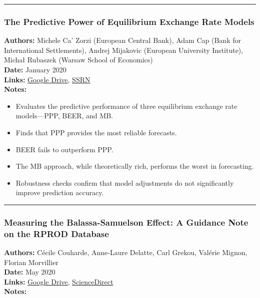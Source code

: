 \documentclass[
  11pt,
]{article}
\providecommand{\tightlist}{%
  \setlength{\itemsep}{0pt}\setlength{\parskip}{0pt}}
\begin{document}
\begin{center}\rule{0.5\linewidth}{0.5pt}\end{center}

\subsubsection{The Predictive Power of Equilibrium Exchange Rate
Models}\label{the-predictive-power-of-equilibrium-exchange-rate-models}

\textbf{Authors:} Michele Ca' Zorzi (European Central Bank), Adam Cap
(Bank for International Settlements), Andrej Mijakovic (European
University Institute), Michał Rubaszek (Warsaw School of Economics)\\
\textbf{Date:} January 2020\\
\textbf{Links:}
\href{https://drive.google.com/file/d/1XJWcFNb5DNIUlFdC4Kl4DVPB8pWIEm3y/view?usp=sharing}{Google
Drive},
\href{https://papers.ssrn.com/sol3/papers.cfm?abstract_id=3515882}{SSRN}\\
\textbf{Notes:}

\begin{itemize}
\tightlist
\item
  Evaluates the predictive performance of three equilibrium exchange
  rate models---PPP, BEER, and MB.
\item
  Finds that PPP provides the most reliable forecasts.
\item
  BEER fails to outperform PPP.
\item
  The MB approach, while theoretically rich, performs the worst in
  forecasting.
\item
  Robustness checks confirm that model adjustments do not significantly
  improve prediction accuracy.
\end{itemize}

\begin{center}\rule{0.5\linewidth}{0.5pt}\end{center}

\subsubsection{Measuring the Balassa-Samuelson Effect: A Guidance Note
on the RPROD
Database}\label{measuring-the-balassa-samuelson-effect-a-guidance-note-on-the-rprod-database}

\textbf{Authors:} Cécile Couharde, Anne-Laure Delatte, Carl Grekou,
Valérie Mignon, Florian Morvillier\\
\textbf{Date:} May 2020\\
\textbf{Links:}
\href{https://drive.google.com/file/d/16L1DDmRDnJ33SYlDcjePIBteyV5TkbHU/view?usp=sharing}{Google
Drive},
\href{https://www.sciencedirect.com/science/article/pii/S2110701720300417}{ScienceDirect}\\
\textbf{Notes:}
\end{document}
